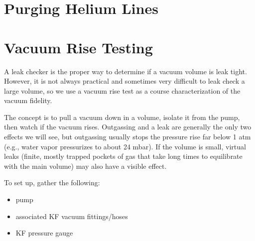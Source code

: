 \section{Purging Helium Lines}

\section{Vacuum Rise Testing}

A leak checker is the proper way to determine if a vacuum volume is leak tight.  However, it is not always practical and sometimes very difficult to leak check a large volume, so we use a vacuum rise test as a course characterization of the vacuum fidelity.


The concept is to pull a vacuum down in a volume, isolate it from the pump, then watch if the vacuum rises.  Outgassing and a leak are generally the only two effects we will see, but outgassing usually stops the pressure rise far below 1 atm (e.g., water vapor pressurizes to about 24 mbar).  If the volume is small, virtual leaks (finite, mostly trapped pockets of gas that take long times to equilibrate with the main volume) may also have a visible effect.

To set up, gather the following:
\begin{itemize}
 \item pump 
 \item associated KF vacuum fittings/hoses
 \item KF pressure gauge
\end{itemize}


